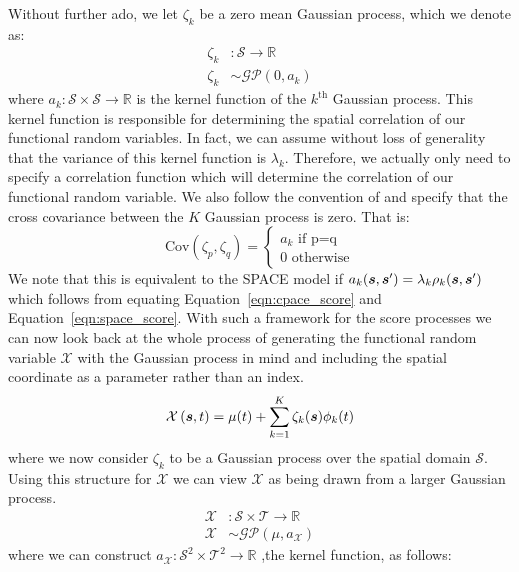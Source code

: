 Without further ado, we let $\zeta_k$ be a zero mean Gaussian process, which we denote as:
\begin{align}
	\zeta_k&: \mathcal{S} \to \mathbb{R} \\
	\zeta_k &\sim \mathcal{GP}\left(0, a_k \right)
\end{align}
where $a_k: \mathcal{S} \times \mathcal{S} \to \mathbb{R} $ is the kernel function of the $k^\text{th}$ Gaussian process. 
This kernel function is responsible for determining the spatial correlation of our functional random variables. 
In fact, we can assume without loss of generality that the variance of this kernel function is $\lambda_k$.
Therefore, we  actually only need to specify a correlation function which will determine the correlation of our functional random variable. 
We also follow the convention of \citep{liu_functional_2017} and specify that the cross covariance between the $K$ Gaussian process is zero.
That is:
\begin{equation}
	\text{Cov}\left(\zeta_p, \zeta_q\right) = \begin{cases}
		a_k \text{ if p=q} \\
		0 \text{ otherwise}
	\end{cases}
	\label{eqn:cpace_score}
\end{equation}
We note that this is equivalent to the SPACE model  if $a_k(\bm{{s}}, \bm{{s}}^{\prime})  = \lambda_k \rho_k(\bm{{s}}, \bm{{s}}^{\prime})$ which follows from equating Equation~\ref{eqn:cpace_score} and Equation~\ref{eqn:space_score}.
With such a framework for the score processes we can now look back at the whole process of generating the functional random variable $\mathcal{X}$ with the Gaussian process in mind and including the spatial coordinate as a parameter rather than an index.
\begin{equation}
	\mathcal{X}\left(\bm{{s}}, t \right) = \mu(t) + \sum_{k=1}^K \zeta_k(\bm{{s}}) \phi_k(t)
\end{equation}
where we now consider $\zeta_k$ to be a Gaussian process over the spatial domain $\mathcal{S}$.
Using this structure for $\mathcal{X}$ we can view $\mathcal{X}$ as being drawn from a larger Gaussian process. 
\begin{align}
	\mathcal{X}&: \mathcal{S} \times \mathcal{T} \to \mathbb{R}\\
	\mathcal{X} &\sim \mathcal{GP}\left(\mu, a_\mathcal{X}\right)
\end{align}
where we can construct $a_\mathcal{X}: \mathcal{S}^2 \times \mathcal{T}^2 \to \mathbb{R}$ ,the kernel function, as follows: 
